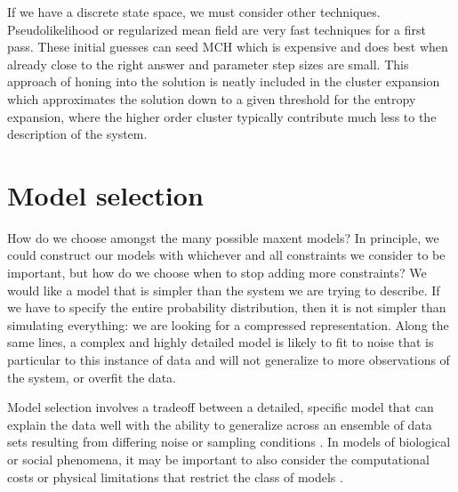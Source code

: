 \documentclass[aps,prl,twocolumn]{revtex4-1}
\begin{document}
If we have a discrete state space, we must consider other techniques. Pseudolikelihood or regularized mean field are very fast techniques for a first pass. These initial guesses can seed MCH which is expensive and does best when already close to the right answer and parameter step sizes are small. This approach of honing into the solution is neatly included in the cluster expansion which approximates the solution down to a given threshold for the entropy expansion, where the higher order cluster typically contribute much less to the description of the system. 

\section{Model selection}

How do we choose amongst the many possible maxent models? In principle, we could construct our models with whichever and all constraints we consider to be important, but how do we choose when to stop adding more constraints?
We would like a model that is simpler than the system we are trying to describe. If we have to specify the entire probability distribution, then it is not simpler than simulating everything: we are looking for a compressed representation. Along the same lines, a complex and highly detailed model is likely to fit to noise that is particular to this instance of data and will not generalize to more observations of the system, or overfit the data.

Model selection involves a tradeoff between a detailed, specific model that can explain the data well with the ability to generalize across an ensemble of data sets resulting from differing noise or sampling conditions \cite{MacKay:2005wc}. In models of biological or social phenomena, it may be important to also consider the computational costs or physical limitations that restrict the class of models \cite{Daniels:1cq}. 
\end{document}
